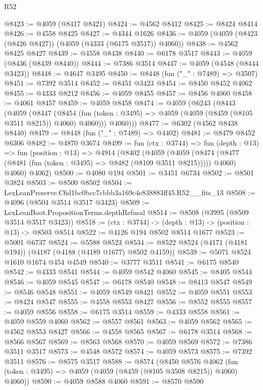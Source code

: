 \begin{lexlean}{R52}
\begin{coremodule}
@8423 := @4059 (@8417 @8421)
@8424 := @4562 @8412
@8425 := @8424 @8414
@8426 := @4558 @8425
@8427 := @4344 @1626
@8436 := @4059 (@4059 (@8423 (@8426 @8427)) (@4059 (@4333 (@6175 @3517)) @4060))
@8438 := @4562 @8425 @8427
@8439 := @4558 @8438
@8440 := @6178 @3517
@8443 := @4059 (@8436 (@8439 @8440))
@8444 := @7386 @3514
@8447 := @4059 (@4548 (@8444 @3423))
@8448 := @4647 @3495
@8450 := @8448 (fun ("_" : @7489) => @3507)
@8451 := @7392 @3514
@8452 := @8451 @3423
@8454 := @8450 @8452 @4062
@8455 := @4333 @8212
@8456 := @4059 @8455
@8457 := @8456 @4060
@8458 := @4061 @8457
@8459 := @4059 @8458
@8474 := @4059
    (@6243
      (@8443
        (@4059
          (@8447
            (@8454 (fun (token : @3495) => @4059 (@4059 (@8459 (@8105 @3511 @8215)) @4060) @4060)))
          @4060)))
@8477 := @6302 (@4562 @8438 @8440)
@8479 := @8448 (fun ("_" : @7489) => @4402)
@8481 := @8479 @8452 @6306
@8482 := @4870 @3674
@8499 := fun (ctx : @3744) =>
  fun (depth : @13) =>
  fun (position : @13) =>
  @4914
    (@8402
      (@4059
        (@4059 (@8474 (@8477 (@8481 (fun (token : @3495) => @8482 (@8109 @3511 @8215))))) @4060)
        @4060)
      @4062)
@8500 := @4080 @194
@8501 := @3451 @6734
@8502 := @8501 @3824
@8503 := @8500 @8502
@8504 := LexLeanPreserve.C6d1bc0bcc7cbbb3a169c4e838883ff45.R52.__fits_13
@8508 := @4096 (@8504 @3514 @3517 @3423)
@8509 := LexLeanBoot.PropositionTerms.depthRefusal
@8514 := @8508 (@3995 (@8509 @3514 @3517 @3423))
@8518 := (ctx : @3744) -> (depth : @13) -> (position : @13) -> @8503 @8514
@8522 := @4126 @194 @8502 @8514 @1677
@8523 := @5001 @6737
@8524 := @5588 @8523
@8534 := @8522 @8524 (@4171 (@4181 @194)) (@4187 (@4188 (@4189 @1677) @8502 @4159))
@8539 := @5071 @8524 @1610 @1674 @454 @4549
@8540 := @3777 @3511
@8541 := @6175 @8540
@8542 := @4333 @8541
@8544 := @4059 @8542 @4060
@8545 := @8405 @8544
@8546 := @4059 @8545
@8547 := @6178 @8540
@8548 := @8413 @8547
@8549 := @8546 @8548
@8551 := @4059 @8549 @8421
@8552 := @4059 @8551
@8553 := @8424 @8547
@8555 := @4558 @8553 @8427
@8556 := @8552 @8555
@8557 := @4059 @8556
@8558 := @6175 @3514
@8559 := @4333 @8558
@8561 := @4059 @8559 @4060
@8562 := @8557 @8561
@8563 := @4059 @8562
@8565 := @4562 @8553 @8427
@8566 := @4558 @8565
@8567 := @6178 @3514
@8568 := @8566 @8567
@8569 := @8563 @8568
@8570 := @4059 @8569
@8572 := @7386 @3511 @3517
@8573 := @4548 @8572
@8574 := @4059 @8573
@8575 := @7392 @3511
@8576 := @8575 @3517
@8588 := @8574
    (@8450
      @8576
      @4062
      (fun (token : @3495) => @4059 (@4059 (@8459 (@8105 @3508 @8215)) @4060) @4060))
@8590 := @4059 @8588 @4060
@8591 := @8570 @8590

\end{coremodule}
\end{lexlean}
